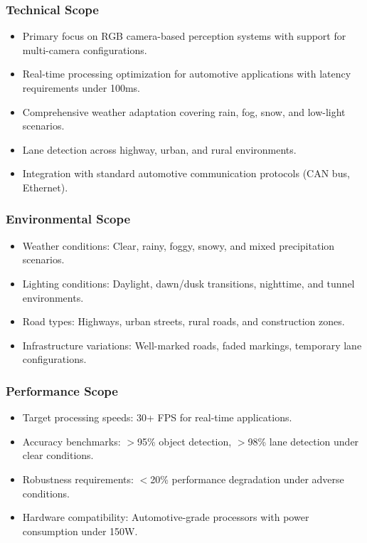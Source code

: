 \subsubsection*{Technical Scope}
\begin{itemize}
    \item Primary focus on RGB camera-based perception systems with support for multi-camera configurations.
    \item Real-time processing optimization for automotive applications with latency requirements under 100ms.
    \item Comprehensive weather adaptation covering rain, fog, snow, and low-light scenarios.
    \item Lane detection across highway, urban, and rural environments.
    \item Integration with standard automotive communication protocols (CAN bus, Ethernet).
\end{itemize}

\subsubsection*{Environmental Scope}
\begin{itemize}
    \item Weather conditions: Clear, rainy, foggy, snowy, and mixed precipitation scenarios.
    \item Lighting conditions: Daylight, dawn/dusk transitions, nighttime, and tunnel environments.
    \item Road types: Highways, urban streets, rural roads, and construction zones.
    \item Infrastructure variations: Well-marked roads, faded markings, temporary lane configurations.
\end{itemize}

\subsubsection*{Performance Scope}
\begin{itemize}
    \item Target processing speeds: 30+ FPS for real-time applications.
    \item Accuracy benchmarks: $>$95\% object detection, $>$98\% lane detection under clear conditions.
    \item Robustness requirements: $<$20\% performance degradation under adverse conditions.
    \item Hardware compatibility: Automotive-grade processors with power consumption under 150W.
\end{itemize}

